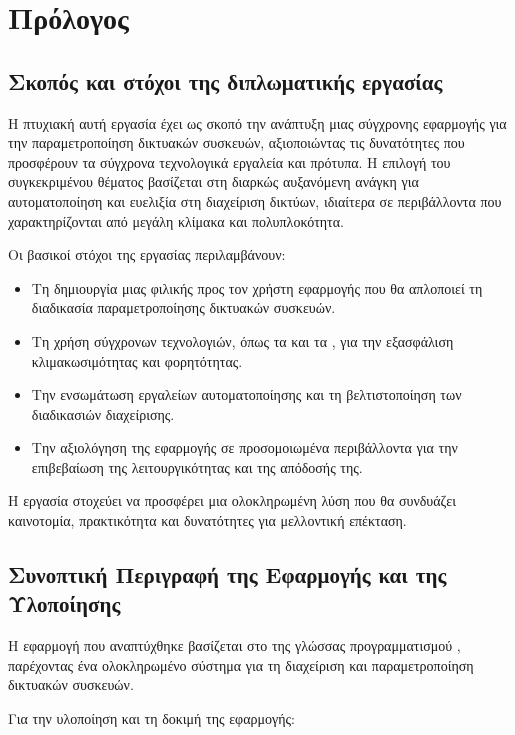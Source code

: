\chapter{Πρόλογος}

\section{Σκοπός και στόχοι της διπλωματικής εργασίας}

Η πτυχιακή αυτή εργασία έχει ως σκοπό την ανάπτυξη μιας σύγχρονης εφαρμογής για την παραμετροποίηση δικτυακών συσκευών, αξιοποιώντας τις δυνατότητες που προσφέρουν τα σύγχρονα τεχνολογικά εργαλεία και πρότυπα. Η επιλογή του συγκεκριμένου θέματος βασίζεται στη διαρκώς αυξανόμενη ανάγκη για αυτοματοποίηση και ευελιξία στη διαχείριση δικτύων, ιδιαίτερα σε περιβάλλοντα που χαρακτηρίζονται από μεγάλη κλίμακα και πολυπλοκότητα.

Οι βασικοί στόχοι της εργασίας περιλαμβάνουν:

\begin{itemize}
    \item Τη δημιουργία μιας φιλικής προς τον χρήστη εφαρμογής που θα απλοποιεί τη διαδικασία παραμετροποίησης δικτυακών συσκευών.
    \item Τη χρήση σύγχρονων τεχνολογιών, όπως τα  και τα , για την εξασφάλιση κλιμακωσιμότητας και φορητότητας.
    \item Την ενσωμάτωση εργαλείων αυτοματοποίησης και τη βελτιστοποίηση των διαδικασιών διαχείρισης.
    \item Την αξιολόγηση της εφαρμογής σε προσομοιωμένα περιβάλλοντα για την επιβεβαίωση της λειτουργικότητας και της απόδοσής της.
\end{itemize}


Η εργασία στοχεύει να προσφέρει μια ολοκληρωμένη λύση που θα συνδυάζει καινοτομία, πρακτικότητα και δυνατότητες για μελλοντική επέκταση.

\section{Συνοπτική Περιγραφή της Εφαρμογής και της Υλοποίησης}

Η εφαρμογή που αναπτύχθηκε βασίζεται στο  της γλώσσας προγραμματισμού , παρέχοντας ένα ολοκληρωμένο  σύστημα για τη διαχείριση και παραμετροποίηση δικτυακών συσκευών.

Για την υλοποίηση και τη δοκιμή της εφαρμογής:

